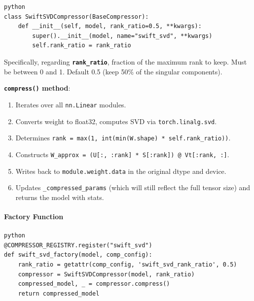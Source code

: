 \vspace{0.5em}
\begin{mdframed}[backgroundcolor=codebg, linecolor=codeframe, linewidth=1pt, roundcorner=4pt, innerleftmargin=2pt, innerrightmargin=5pt, innertopmargin=5pt, innerbottommargin=5pt]
\begin{lstlisting}
python
class SwiftSVDCompressor(BaseCompressor):
    def __init__(self, model, rank_ratio=0.5, **kwargs):
        super().__init__(model, name="swift_svd", **kwargs)
        self.rank_ratio = rank_ratio
\end{lstlisting}
\end{mdframed}
\vspace{0.5em}

Specifically, regarding \textbf{\texttt{rank\_ratio}}, fraction of the maximum rank to keep. Must be between 0 and 1. Default 0.5 (keep 50\% of the singular components).


\textbf{\texttt{compress()} method}:

\begin{enumerate}
\item Iterates over all \texttt{nn.Linear} modules.
\item Converts weight to float32, computes SVD via \texttt{torch.linalg.svd}.
\item Determines \texttt{rank = max(1, int(min(W.shape) * self.rank\_ratio))}.
\item Constructs \texttt{W\_approx = (U[:, :rank] * S[:rank]) @ Vt[:rank, :]}.
\item Writes back to \texttt{module.weight.data} in the original dtype and device.
\item Updates \texttt{\_compressed\_params} (which will still reflect the full tensor size) and returns the model with stats.

\end{enumerate}
\paragraph{Factory Function}

\vspace{0.5em}
\begin{mdframed}[backgroundcolor=codebg, linecolor=codeframe, linewidth=1pt, roundcorner=4pt, innerleftmargin=2pt, innerrightmargin=5pt, innertopmargin=5pt, innerbottommargin=5pt]
\begin{lstlisting}
python
@COMPRESSOR_REGISTRY.register("swift_svd")
def swift_svd_factory(model, comp_config):
    rank_ratio = getattr(comp_config, 'swift_svd_rank_ratio', 0.5)
    compressor = SwiftSVDCompressor(model, rank_ratio)
    compressed_model, _ = compressor.compress()
    return compressed_model
\end{lstlisting}
\end{mdframed}
\vspace{0.5em}

